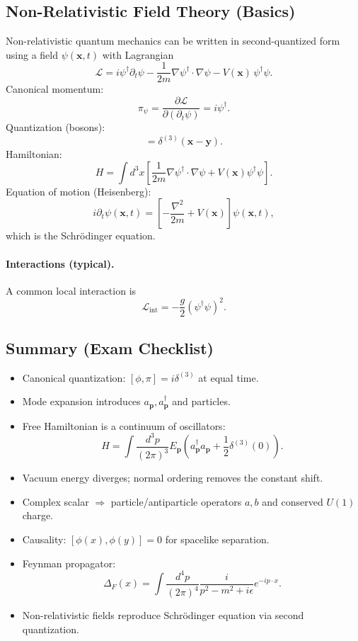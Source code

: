 \subsection{Non-Relativistic Field Theory (Basics)}
Non-relativistic quantum mechanics can be written in second-quantized form using a field
$\psi(\mathbf{x},t)$ with Lagrangian
\begin{equation}
\mathcal{L}
=
i\psi^\dagger\partial_t\psi
-\frac{1}{2m}\nabla\psi^\dagger\cdot\nabla\psi
- V(\mathbf{x})\,\psi^\dagger\psi.
\end{equation}
Canonical momentum:
\begin{equation}
\pi_\psi=\frac{\partial\mathcal{L}}{\partial(\partial_t\psi)}=i\psi^\dagger.
\end{equation}
Quantization (bosons):
\begin{equation}
[\psi(\mathbf{x},t),\psi^\dagger(\mathbf{y},t)]=\delta^{(3)}(\mathbf{x}-\mathbf{y}).
\end{equation}
Hamiltonian:
\begin{equation}
H=\int d^3x\left[\frac{1}{2m}\nabla\psi^\dagger\cdot\nabla\psi
+V(\mathbf{x})\psi^\dagger\psi\right].
\end{equation}
Equation of motion (Heisenberg):
\begin{equation}
i\partial_t\psi(\mathbf{x},t)=\left[-\frac{\nabla^2}{2m}+V(\mathbf{x})\right]\psi(\mathbf{x},t),
\end{equation}
which is the Schr\"odinger equation.

\paragraph{Interactions (typical).}
A common local interaction is
\begin{equation}
\mathcal{L}_{\mathrm{int}}=-\frac{g}{2}(\psi^\dagger\psi)^2.
\end{equation}

\subsection{Summary (Exam Checklist)}
\begin{itemize}
\item Canonical quantization: $[\phi,\pi]=i\delta^{(3)}$ at equal time.
\item Mode expansion introduces $a_{\mathbf{p}},a^\dagger_{\mathbf{p}}$ and particles.
\item Free Hamiltonian is a continuum of oscillators:
\[
H=\int \frac{d^3p}{(2\pi)^3}E_{\mathbf{p}}\left(a^\dagger_{\mathbf{p}}a_{\mathbf{p}}+\frac12\delta^{(3)}(0)\right).
\]
\item Vacuum energy diverges; normal ordering removes the constant shift.
\item Complex scalar $\Rightarrow$ particle/antiparticle operators $a,b$ and conserved $U(1)$ charge.
\item Causality: $[\phi(x),\phi(y)]=0$ for spacelike separation.
\item Feynman propagator:
\[
\Delta_F(x)=\int\frac{d^4p}{(2\pi)^4}\frac{i}{p^2-m^2+i\epsilon}e^{-ip\cdot x}.
\]
\item Non-relativistic fields reproduce Schr\"odinger equation via second quantization.
\end{itemize}
